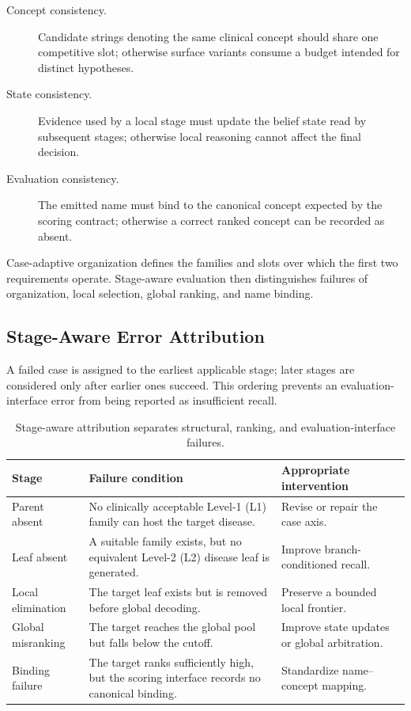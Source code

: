 \documentclass[letterpaper]{article} %
\begin{document}
\begin{description}
  \item[Concept consistency.]
  Candidate strings denoting the same clinical concept should share one competitive slot; otherwise surface variants consume a budget intended for distinct hypotheses.
  \item[State consistency.]
  Evidence used by a local stage must update the belief state read by subsequent stages; otherwise local reasoning cannot affect the final decision.
  \item[Evaluation consistency.]
  The emitted name must bind to the canonical concept expected by the scoring contract; otherwise a correct ranked concept can be recorded as absent.
\end{description}

Case-adaptive organization defines the families and slots over which the first two requirements operate.
Stage-aware evaluation then distinguishes failures of organization, local selection, global ranking, and name binding.

\subsection{Stage-Aware Error Attribution}
\label{sec:taxonomy}

A failed case is assigned to the earliest applicable stage; later stages are considered only after earlier ones succeed.
This ordering prevents an evaluation-interface error from being reported as insufficient recall.

\begin{table}[t]
\centering
\small
\begin{tabular}{lp{7.4cm}p{4.3cm}}
\toprule
Stage & Failure condition & Appropriate intervention \\
\midrule
Parent absent & No clinically acceptable Level-1 (L1) family can host the target disease. & Revise or repair the case axis. \\
Leaf absent & A suitable family exists, but no equivalent Level-2 (L2) disease leaf is generated. & Improve branch-conditioned recall. \\
Local elimination & The target leaf exists but is removed before global decoding. & Preserve a bounded local frontier. \\
Global misranking & The target reaches the global pool but falls below the cutoff. & Improve state updates or global arbitration. \\
Binding failure & The target ranks sufficiently high, but the scoring interface records no canonical binding. & Standardize name--concept mapping. \\
\bottomrule
\end{tabular}
\caption{Stage-aware attribution separates structural, ranking, and evaluation-interface failures.}
\label{tab:stages}
\end{table}
\end{document}
